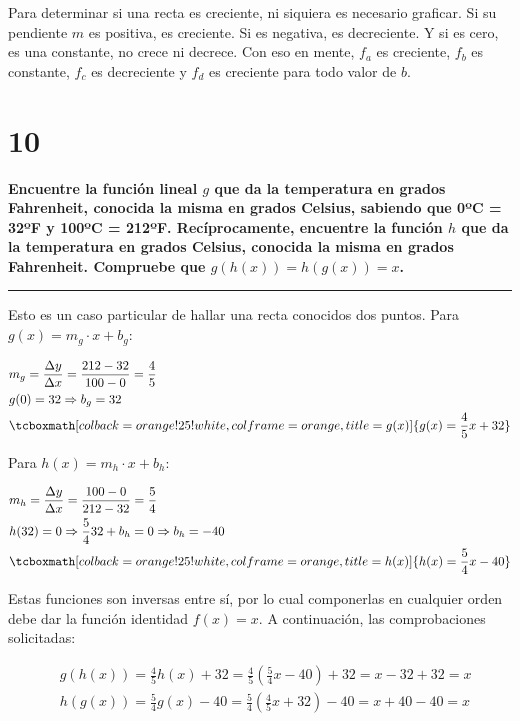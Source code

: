 \documentclass{article}
\newcommand{\hresult}[2]{\tcboxmath[colback=orange!25!white,colframe=orange, title=#1] {#2} }
\newcommand{\sectionx}[1]{\section*{#1}\label{sec:#1}\addcontentsline{toc}{section}{\nameref{sec:#1}}}
\begin{document}
Para determinar si una recta es creciente, ni siquiera es necesario graficar. Si su pendiente $m$ es positiva, es creciente. Si es negativa, es decreciente. Y si es cero, es una constante, no crece ni decrece. Con eso en mente, $f_a$ es creciente, $f_b$ es constante, $f_c$ es decreciente y $f_d$ es creciente para todo valor de $b$.

\sectionx{10}

\textbf{Encuentre la función lineal $g$ que da la temperatura en grados Fahrenheit, conocida la misma en grados Celsius, sabiendo que 0ºC = 32ºF y 100ºC = 212ºF. Recíprocamente, encuentre la función $h$ que da la temperatura en grados Celsius, conocida la misma en grados Fahrenheit. Compruebe que $g(h(x)) = h(g(x)) = x$.}

\vspace{1em}
\hrule
\vspace{1em}

Esto es un caso particular de hallar una recta conocidos dos puntos. Para $g(x) = m_g \cdot x + b_g$:

\begin{subequations}
\begin{align}
& m_g = \frac{\Delta y}{\Delta x} = \frac{212-32}{100-0} = \frac{4}{5} \\
& g(0) = 32 \Rightarrow b_g = 32 \\
& \hresult{g(x)}{  g(x) = \frac{4}{5} x + 32 }
\end{align}
\end{subequations}

Para $h(x) = m_h \cdot x + b_h:$

\begin{subequations}
\begin{align}
& m_h = \frac{\Delta y}{\Delta x} = \frac{100-0}{212-32} = \frac{5}{4} \\
& h(32) = 0 \Rightarrow \frac{5}{4} 32 + b_h = 0 \Rightarrow b_h = -40 \\
& \hresult{h(x)}{  h(x) = \frac{5}{4} x - 40 }
\end{align}
\end{subequations}

Estas funciones son inversas entre sí, por lo cual componerlas en cualquier orden debe dar la función identidad $f(x) = x$. A continuación, las comprobaciones solicitadas:

\begin{subequations}
\begin{align}
& g(h(x)) = \frac{4}{5} h(x) + 32 = \frac{4}{5} \left( \frac{5}{4} x - 40 \right) + 32 = x - 32 + 32 = x \\
& h(g(x)) = \frac{5}{4} g(x) - 40 = \frac{5}{4} \left( \frac{4}{5} x +32 \right) -40 = x + 40 - 40 = x
\end{align}
\end{subequations}
\end{document}
